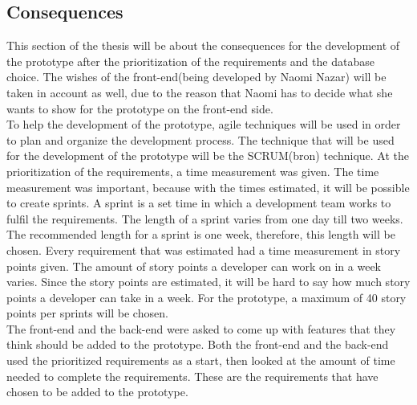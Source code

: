 \documentclass[paper=a4, fontsize=11pt,twoside]{scrartcl}	%
\begin{document}
\subsection{Consequences}
This section of the thesis will be about the consequences for the development of the prototype after the prioritization of the requirements and the database choice. The wishes of the front-end(being developed by Naomi Nazar) will be taken in account as well, due to the reason that Naomi has to decide what she wants to show for the prototype on the front-end side. \\
To help the development of the prototype, agile techniques will be used in order to plan and organize the development process. The technique that will be used for the development of the prototype will be the SCRUM(bron) technique. At the prioritization of the requirements, a time measurement was given. The time measurement was important, because with the times estimated, it will be possible to create sprints. A sprint is a set time in which a development team works to fulfil the requirements. The length of a sprint varies from one day till two weeks. The recommended length for a sprint is one week, therefore, this length will be chosen. Every requirement that was estimated had a time measurement in story points given. The amount of story points a developer can work on in a week varies. Since the story points are estimated, it will be hard to say how much story points a developer can take in a week. For the prototype, a maximum of 40 story points per sprints will be chosen. \\
The front-end and the back-end were asked to come up with features that they think should be added to the prototype. Both the front-end and the back-end used the prioritized requirements as a start, then looked at the amount of time needed to complete the requirements. These are the requirements that have chosen to be added to the prototype. \\
\end{document}
